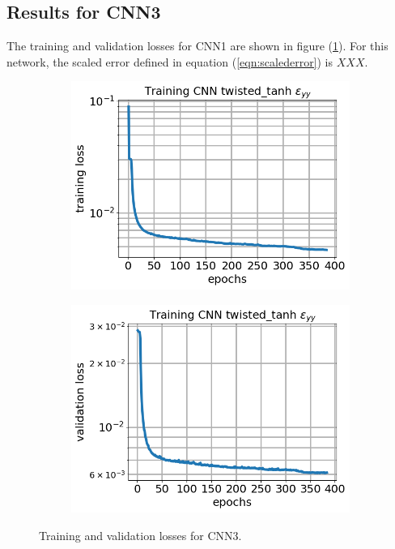 \documentclass[12pt]{article}
\begin{document}
\subsection{\label{sect:resultscnn3}Results for CNN3}
The training and validation losses for CNN1 are shown in figure (\ref{fig:cnn3losses}). For this network, the scaled error defined in equation (\ref{eqn:scalederror}) is $XXX$.
\begin{figure}[h]
  \centering
  \begin{subfigure}[c]{0.45\linewidth}
    \includegraphics[totalheight=4cm]{Figures/Results3/loss.png}
  \end{subfigure}
%  
  \begin{subfigure}[c]{0.45\linewidth}
    \includegraphics[totalheight=4cm]{Figures/Results3/val_loss.png}
  \end{subfigure}
  \caption{\label{fig:cnn3losses} Training and validation losses for CNN3.}
\end{figure}
%
\end{document}
